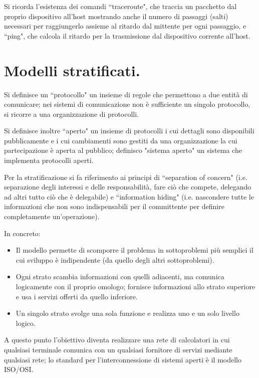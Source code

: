 \documentclass[11pt, italian, openany]{book}
\begin{document}
\begin{sloppypar}
Si ricorda l'esistenza dei comandi ``traceroute", che traccia un pacchetto dal proprio dispositivo all'host mostrando anche il numero di passaggi
(salti) necessari per raggiungerlo assieme al ritardo dal mittente per ogni passaggio, e ``ping", che calcola il ritardo per la trasmissione dal
dispositivo corrente all'host.

\section{Modelli stratificati.}
Si definisce un ``protocollo" un insieme di regole che permettono a due entit\`a di comunicare; nei sistemi di comunicazione non \`e
sufficiente un singolo protocollo, si ricorre a una organizzazione di protocolli.

Si definisce inoltre ``aperto" un insieme di protocolli i cui dettagli sono disponibili pubblicamente e i cui cambiamenti sono gestiti da una
organizzazione la cui partecipazione \`e aperta al pubblico; definisco "sistema aperto" un sistema che implementa protocolli aperti.

Per la stratificazione si fa riferimento ai principi di ``separation of concern" (i.e. separazione degli interessi e delle responsabilit\`a, fare
ci\`o che compete, delegando ad altri tutto ci\`o che \`e delegabile) e ``information hiding" (i.e. nascondere tutte le informazioni che non sono
indispensabili per il committente per definire completamente un'operazione).

In concreto:
\begin{itemize}[topsep=0pt]
	\itemsep-0.3em
	\item Il modello permette di scomporre il problema in sottoproblemi pi\`u semplici il cui sviluppo \`e indipendente (da quello degli altri
	sottoproblemi).
	\item Ogni strato scambia informazioni con quelli adiacenti, ma comunica logicamente con il proprio omologo; fornisce informazioni allo strato
	superiore e usa i servizi offerti da quello inferiore.
	\item Un singolo strato svolge una sola funzione e realizza uno e un solo livello logico.
\end{itemize}

A questo punto l'obiettivo diventa realizzare una rete di calcolatori in cui qualsiasi terminale comunica con un qualsiasi fornitore di servizi
mediante qualsiasi rete; lo standard per l'interconnessione di sistemi aperti \`e il modello ISO/OSI.


\end{sloppypar}
\end{document}
